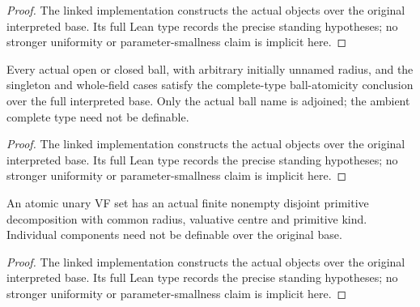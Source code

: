 \begin{proof}


\leanok

The linked implementation constructs the actual objects over the original interpreted base. Its full Lean type records the precise standing hypotheses; no stronger uniformity or parameter-smallness claim is implicit here.

\end{proof}

\begin{lemma}

\label{s3-4}


\leanok

Every actual open or closed ball, with arbitrary initially unnamed radius, and the singleton and whole-field cases satisfy the complete-type ball-atomicity conclusion over the full interpreted base. Only the actual ball name is adjoined; the ambient complete type need not be definable.

\end{lemma}

\begin{proof}


\leanok

The linked implementation constructs the actual objects over the original interpreted base. Its full Lean type records the precise standing hypotheses; no stronger uniformity or parameter-smallness claim is implicit here.

\end{proof}

\begin{lemma}

\label{s3-6}


\leanok

An atomic unary VF set has an actual finite nonempty disjoint primitive decomposition with common radius, valuative centre and primitive kind. Individual components need not be definable over the original base.

\end{lemma}

\begin{proof}


\leanok

The linked implementation constructs the actual objects over the original interpreted base. Its full Lean type records the precise standing hypotheses; no stronger uniformity or parameter-smallness claim is implicit here.

\end{proof}

